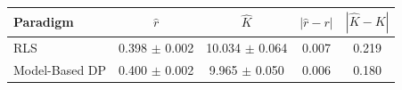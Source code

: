 \begin{tabular}{lcccc}
\toprule
Paradigm & $\hat r$ & $\hat K$ & $|\hat r - r|$ & $|\hat K - K|$ \\
\midrule
RLS & 0.398 $\pm$ 0.002 & 10.034 $\pm$ 0.064 & 0.007 & 0.219 \\
Model-Based DP & 0.400 $\pm$ 0.002 & 9.965 $\pm$ 0.050 & 0.006 & 0.180 \\
\bottomrule
\end{tabular}
